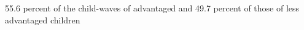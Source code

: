 55.6 percent of the child-waves of advantaged and 49.7 percent of those of less advantaged children%
